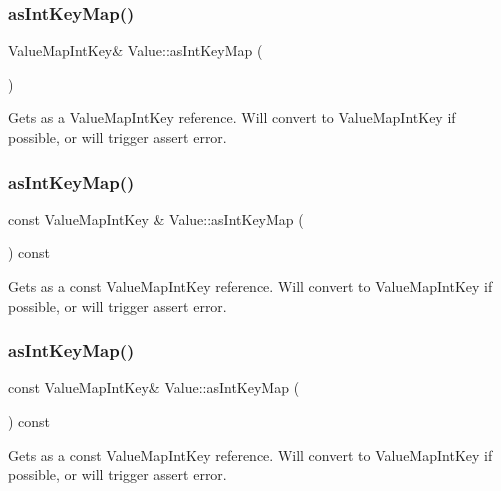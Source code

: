 \subsubsection{\texorpdfstring{as\+Int\+Key\+Map()}{asIntKeyMap()}\hspace{0.1cm}{\footnotesize\ttfamily [2/4]}}
{\footnotesize\ttfamily Value\+Map\+Int\+Key\& Value\+::as\+Int\+Key\+Map (\begin{DoxyParamCaption}{ }\end{DoxyParamCaption})}

Gets as a Value\+Map\+Int\+Key reference. Will convert to Value\+Map\+Int\+Key if possible, or will trigger assert error. \mbox{\label{classValue_ada3362af0e99f76eeb99f75d1abf14c5}} 
\subsubsection{\texorpdfstring{as\+Int\+Key\+Map()}{asIntKeyMap()}\hspace{0.1cm}{\footnotesize\ttfamily [3/4]}}
{\footnotesize\ttfamily const Value\+Map\+Int\+Key \& Value\+::as\+Int\+Key\+Map (\begin{DoxyParamCaption}{ }\end{DoxyParamCaption}) const}

Gets as a const Value\+Map\+Int\+Key reference. Will convert to Value\+Map\+Int\+Key if possible, or will trigger assert error. \mbox{\label{classValue_a4d0c55fe89b4b63a3da652a40f06cd26}} 
\subsubsection{\texorpdfstring{as\+Int\+Key\+Map()}{asIntKeyMap()}\hspace{0.1cm}{\footnotesize\ttfamily [4/4]}}
{\footnotesize\ttfamily const Value\+Map\+Int\+Key\& Value\+::as\+Int\+Key\+Map (\begin{DoxyParamCaption}{ }\end{DoxyParamCaption}) const}

Gets as a const Value\+Map\+Int\+Key reference. Will convert to Value\+Map\+Int\+Key if possible, or will trigger assert error. \mbox{\label{classValue_af2125ceb5eb007b6cd6ab77666682117}} 
